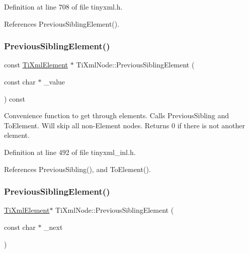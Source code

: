 Definition at line 708 of file tinyxml.\+h.



References Previous\+Sibling\+Element().

\hypertarget{class_ti_xml_node_a6ecef83c4e10c9d0987f09f3ee08de82}{}\label{class_ti_xml_node_a6ecef83c4e10c9d0987f09f3ee08de82} 
\subsubsection{\texorpdfstring{Previous\+Sibling\+Element()}{PreviousSiblingElement()}\hspace{0.1cm}{\footnotesize\ttfamily [3/4]}}
{\footnotesize\ttfamily const \hyperlink{class_ti_xml_element}{Ti\+Xml\+Element} $\ast$ Ti\+Xml\+Node\+::\+Previous\+Sibling\+Element (\begin{DoxyParamCaption}\item[{const char $\ast$}]{\+\_\+value }\end{DoxyParamCaption}) const}

Convenience function to get through elements. Calls Previous\+Sibling and To\+Element. Will skip all non-\/\+Element nodes. Returns 0 if there is not another element. 

Definition at line 492 of file tinyxml\+\_\+inl.\+h.



References Previous\+Sibling(), and To\+Element().

\hypertarget{class_ti_xml_node_a976f74fdd0e49a53502ebf1eda8e63a9}{}\label{class_ti_xml_node_a976f74fdd0e49a53502ebf1eda8e63a9} 
\subsubsection{\texorpdfstring{Previous\+Sibling\+Element()}{PreviousSiblingElement()}\hspace{0.1cm}{\footnotesize\ttfamily [4/4]}}
{\footnotesize\ttfamily \hyperlink{class_ti_xml_element}{Ti\+Xml\+Element}$\ast$ Ti\+Xml\+Node\+::\+Previous\+Sibling\+Element (\begin{DoxyParamCaption}\item[{const char $\ast$}]{\+\_\+next }\end{DoxyParamCaption})\hspace{0.3cm}{\ttfamily [inline]}}



